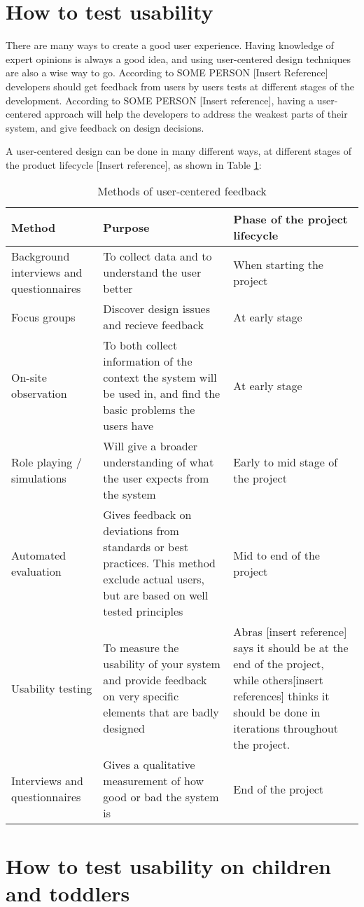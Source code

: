 \section{How to test usability}
There are many ways to create a good user experience. Having knowledge of expert opinions is always a good idea, and using user-centered design techniques are also a wise way to go. According to SOME PERSON [Insert Reference] developers should get feedback from users by users tests at different stages of the development. According to SOME PERSON [Insert reference], having a user-centered approach will help the developers to address the weakest parts of their system, and give feedback on design decisions. 

A user-centered design can be done in many different ways, at different stages of the product lifecycle [Insert reference], as shown in Table \ref{table:designduringlifecycle}:

\begin{table}
\begin{tabular}{|p{5cm} | p{5cm} | p{5cm} |}
\hline
\textbf{Method} & \textbf{Purpose} & \textbf{Phase of the project lifecycle} \\ \hline
Background interviews and questionnaires & To collect data and to understand the user better & When starting the project \\ \hline
Focus groups & Discover design issues and recieve feedback & At early stage \\ \hline
On-site observation & To both collect information of the context the system will be used in, and find the basic problems the users have & At early stage \\ \hline
Role playing / simulations & Will give a broader understanding of what the user expects from the system & Early to mid stage of the project \\ \hline
Automated evaluation & Gives feedback on deviations from standards or best practices. This method exclude actual users, but are based on well tested principles & Mid to end of the project \\ \hline
Usability testing & To measure the usability of your system and provide feedback on very specific elements that are badly designed & Abras [insert reference] says it should be at the end of the project, while others[insert references] thinks it should be done in iterations throughout the project. \\ \hline
Interviews and questionnaires & Gives a qualitative measurement of how good or bad the system is & End of the project \\ \hline
\end{tabular}
\caption{Methods of user-centered feedback}
\label{table:designduringlifecycle}
\end{table}


\section{How to test usability on children and toddlers}